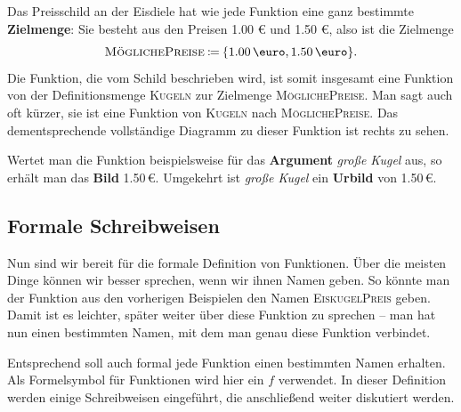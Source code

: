 \documentclass[../../main.tex]{subfiles}
\begin{document}
\begin{example}{}
    Das Preisschild an der Eisdiele hat wie jede Funktion eine ganz bestimmte \textbf{Zielmenge}: Sie besteht aus den Preisen 1.00 \euro{} und 1.50 \euro, also ist die Zielmenge \[\textsc{MöglichePreise}\defas\{\text{1.00\,\euro},\text{1.50\,\euro}\}.\]
    Die Funktion, die vom Schild beschrieben wird, ist somit insgesamt eine Funktion von der Definitionsmenge \textsc{Kugeln} zur Zielmenge \textsc{MöglichePreise}. Man sagt auch oft kürzer, sie ist eine Funktion von \textsc{Kugeln} nach \textsc{MöglichePreise}. Das dementsprechende vollständige Diagramm zu dieser Funktion ist rechts zu sehen.
    
    Wertet man die Funktion beispielsweise für das \textbf{Argument} \emph{große Kugel} aus, so erhält man das \textbf{Bild} 1.50\,\euro. Umgekehrt ist \emph{große Kugel} ein \textbf{Urbild} von 1.50\,\euro.
\end{example}


\subsection*{Formale Schreibweisen}
\label{sec:abbildungen_definition}
Nun sind wir bereit für die formale Definition von Funktionen. Über die meisten Dinge können wir besser sprechen, wenn wir ihnen Namen geben. So könnte man der Funktion aus den vorherigen Beispielen den Namen \textsc{EiskugelPreis} geben. Damit ist es leichter, später weiter über diese Funktion zu sprechen -- man hat nun einen bestimmten Namen, mit dem man genau diese Funktion verbindet.

Entsprechend soll auch formal jede Funktion einen bestimmten Namen erhalten. Als Formelsymbol für Funktionen wird hier ein $f$ verwendet. In dieser Definition werden einige Schreibweisen eingeführt, die anschließend weiter diskutiert werden.
\end{document}
